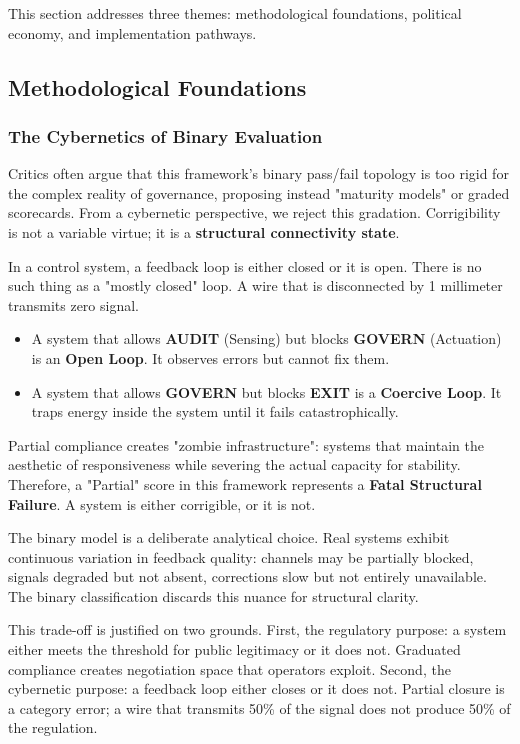 This section addresses three themes: methodological foundations, political economy, and implementation pathways.

\subsection{Methodological Foundations}
\label{subsec:methodology}

\subsubsection{The Cybernetics of Binary Evaluation}

Critics often argue that this framework's binary pass/fail topology is too rigid for the complex reality of governance, proposing instead "maturity models" or graded scorecards. From a cybernetic perspective, we reject this gradation. Corrigibility is not a variable virtue; it is a \textbf{structural connectivity state}.

In a control system, a feedback loop is either closed or it is open. There is no such thing as a "mostly closed" loop. A wire that is disconnected by 1 millimeter transmits zero signal.

\begin{itemize}
    \item A system that allows \textbf{AUDIT} (Sensing) but blocks \textbf{GOVERN} (Actuation) is an \textbf{Open Loop}. It observes errors but cannot fix them.
    \item A system that allows \textbf{GOVERN} but blocks \textbf{EXIT} is a \textbf{Coercive Loop}. It traps energy inside the system until it fails catastrophically.
\end{itemize}

Partial compliance creates "zombie infrastructure": systems that maintain the aesthetic of responsiveness while severing the actual capacity for stability. Therefore, a "Partial" score in this framework represents a \textbf{Fatal Structural Failure}. A system is either corrigible, or it is not.

The binary model is a deliberate analytical choice. Real systems exhibit continuous variation in feedback quality: channels may be partially blocked, signals degraded but not absent, corrections slow but not entirely unavailable. The binary classification discards this nuance for structural clarity.

This trade-off is justified on two grounds. First, the regulatory purpose: a system either meets the threshold for public legitimacy or it does not. Graduated compliance creates negotiation space that operators exploit. Second, the cybernetic purpose: a feedback loop either closes or it does not. Partial closure is a category error; a wire that transmits 50\% of the signal does not produce 50\% of the regulation.


